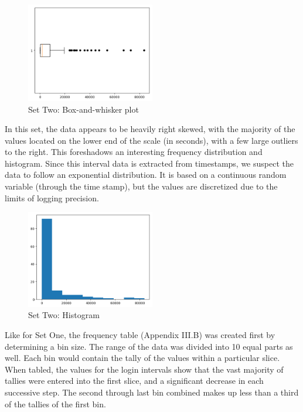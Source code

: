 \documentclass[10pt]{report}
\begin{document}
\begin{figure}
    \centering
    \includegraphics[width=0.50\textwidth]{results/logininterval_boxplot}
    \caption{Set Two: Box-and-whisker plot}
\end{figure}

In this set, the data appears to be heavily right skewed, with the majority of the values located on the lower
end of the scale (in seconds), with a few large outliers to the right. This foreshadows an interesting frequency
distribution and histogram. Since this interval data is extracted from timestamps, we suspect the data to follow an
exponential distribution. It is based on a continuous random variable (through the time stamp), but the values are
discretized due to the limits of logging precision.

\begin{figure}
    \centering
    \includegraphics[width=0.50\textwidth]{results/logininterval_histogram}
    \caption{Set Two: Histogram}
\end{figure}

Like for Set One, the frequency table (Appendix III.B) was created first by determining a bin size. The range of the data was
divided into 10 equal parts as well. Each bin would contain the tally of the values within
a particular slice.
When tabled, the values for the login intervals show that the vast majority
of tallies were entered into the first slice, and a significant decrease in each successive step. The second
through last bin combined makes up less than a third of the tallies of the first bin.
\end{document}
